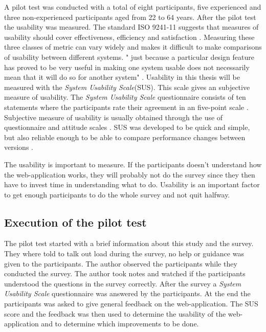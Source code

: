 A pilot test was conducted with a total of eight participants, five experienced and three non-experienced participants aged from 22 to 64 years. After the pilot test the usability was measured. The standard ISO 9241-11 suggests that measures of usability should cover effectiveness, efficiency and satisfaction \citep{ISO1998}. Measuring these three classes of metric can vary widely and makes it difficult to make comparisons of usability between different systems. " just because a particular design feature has proved to be very useful in making one system usable does not necessarily mean that it will do so for another system" \citep{Brooke1996}. Usability in this thesis will be measured with the \textit{System Usability Scale}(SUS). This scale gives an subjective measure of usability. The \textit{System Usability Scale} questionnaire consists of ten statements where the participants rate their agreement in an five-point scale \citep{Ben2009}. Subjective measure of usability is usually obtained through the use of questionnaire and attitude scales \citep{Brooke1996}. SUS was developed to be quick and simple, but also reliable enough to be able to compare performance changes between versions \citep{Brooke1996}.  

The usability is important to measure. If the participants doesn't understand how the web-application works, they will probably not do the survey since they then have to invest time in understanding what to do. %
Usability is an important factor to get enough participants to do the whole survey and not quit halfway. 

\subsection{Execution of the pilot test}
The pilot test started with a brief information about this study and the survey. They where told to talk out load during the survey, no help or guidance was given to the participants. The author observed the participants while they conducted the survey. The author took notes and watched if the participants understood the questions in the survey correctly. After the survey a \textit{System Usability Scale} questionnaire was answered by the participants. At the end the participants was asked to give general feedback on the web-application. The SUS score and the feedback was then used to determine the usability of the web-application and to determine which improvements to be done.  

